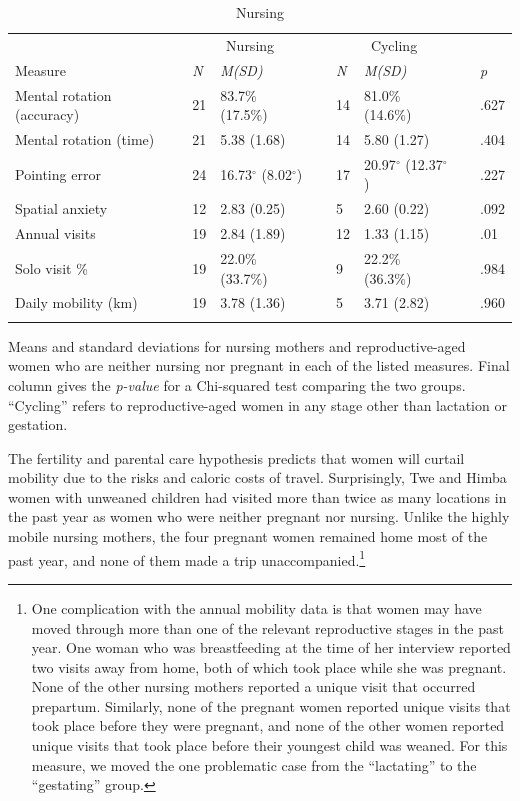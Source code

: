 \begin{table}[h!]
\caption{Nursing}
\label{tab:lact}  
\begin{tabular}{llllllll}
\hline\noalign{\smallskip}
& \multicolumn{2}{c}{Nursing} && \multicolumn{2}{c}{Cycling} && \\
Measure & \emph{N} & \emph{M(SD)} && \emph{N} & \emph{M(SD)} && \emph{p} \\
\noalign{\smallskip}\hline\noalign{\smallskip}
Mental rotation (accuracy) & 21 & 83.7\% (17.5\%) && 14 & 81.0\% (14.6\%) && .627 \\
Mental rotation (time) & 21 & 5.38 (1.68) && 14 & 5.80 (1.27) && .404 \\
Pointing error & 24 & 16.73$^{\circ}$ (8.02$^{\circ}$) && 17 & 20.97$^{\circ}$ (12.37$^{\circ}$) && .227 \\
Spatial anxiety & 12 & 2.83 (0.25) && 5 & 2.60 (0.22) && .092 \\
Annual visits & 19 & 2.84 (1.89) && 12 & 1.33 (1.15) && .01 \\
Solo visit \% & 19 & 22.0\% (33.7\%) && 9 & 22.2\% (36.3\%) && .984 \\
Daily mobility (km) & 19 & 3.78 (1.36) && 5 & 3.71 (2.82) && .960 \\
\noalign{\smallskip}\hline
\end{tabular}\par
\bigskip
Means and standard deviations for nursing mothers and reproductive-aged women who are neither nursing nor pregnant in each of the listed measures. Final column gives the \emph{p-value} for a Chi-squared test comparing the two groups.  ``Cycling'' refers to reproductive-aged women in any stage other than lactation or gestation.  
\end{table}	

The fertility and parental care hypothesis predicts that women will curtail mobility due to the risks and caloric costs of travel.  Surprisingly, Twe and Himba women with unweaned children had visited more than twice as many locations in the past year as women who were neither pregnant nor nursing.  Unlike the highly mobile nursing mothers, the four pregnant women remained home most of the past year, and none of them made a trip unaccompanied.\footnote{One complication with the annual mobility data is that women may have moved through more than one of the relevant reproductive stages in the past year. One woman who was breastfeeding at the time of her interview reported two visits away from home, both of which took place while she was pregnant.  None of the other nursing mothers reported a unique visit that occurred prepartum.  Similarly, none of the pregnant women reported unique visits that took place before they were pregnant, and none of the other women reported unique visits that took place before their youngest child was weaned.  For this measure, we moved the one problematic case from the ``lactating'' to the ``gestating'' group.}


